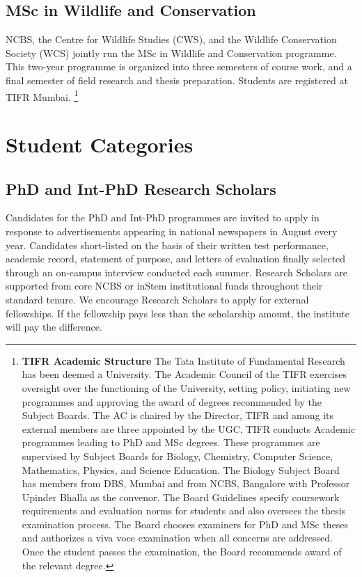 \documentclass[a4paper,10pt]{article}
\begin{document}
\subsection{MSc in Wildlife and Conservation} NCBS, the Centre for Wildlife
Studies (CWS), and the Wildlife Conservation Society (WCS) jointly run the MSc
in Wildlife and Conservation programme. This two-year programme is organized
into three semesters of course work, and a final semester of field research and
thesis preparation. Students are registered at TIFR Mumbai. \footnote{
    \textbf{TIFR Academic Structure} The Tata Institute of Fundamental Research
    has been deemed a University. The Academic Council of the TIFR exercises
    oversight over the functioning of the University, setting policy, initiating
    new programmes and approving the award of degrees recommended by the Subject
    Boards. The AC is chaired by the Director, TIFR and among its external
    members are three appointed by the UGC. TIFR conducts Academic programmes
    leading to PhD and MSc degrees. These programmes are supervised by Subject
    Boards for Biology, Chemistry, Computer Science, Mathematics, Physics, and
    Science Education. The Biology Subject Board has members from DBS, Mumbai
    and from NCBS, Bangalore with Professor Upinder Bhalla as the convenor. The
    Board Guidelines specify coursework requirements and evaluation norms for
    students and also oversees the thesis examination process. The Board chooses
    examiners for PhD and MSc theses and authorizes a viva voce examination when
    all concerns are addressed. Once the student passes the examination, the
    Board recommends award of the relevant degree.
}


\section{Student Categories}

\subsection{PhD and Int-PhD Research Scholars}

Candidates for the PhD and Int-PhD programmes are invited to apply in response
to advertisements appearing in national newspapers in August every year.
Candidates short-listed on the basis of their written test performance, academic
record, statement of purpose, and letters of evaluation finally selected through
an on-campus interview conducted each summer. Research Scholars are supported
from core NCBS or inStem institutional funds throughout their standard tenure.
We encourage Research Scholars to apply for external fellowships. If the
fellowship pays less than the scholarship amount, the institute will pay the
difference.  
\end{document}
